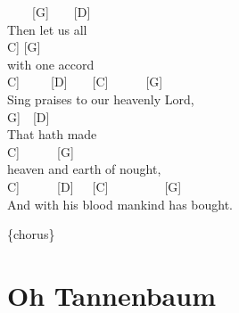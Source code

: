 \documentclass[
  letterpaper,
  a5paper]{memoir}
\begin{document}
~~~~{[}G{]}~~~~{[}D{]}\\
Then let us all\\
\hspace*{0.333em}\hspace*{0.333em}\hspace*{0.333em}\hspace*{0.333em}{[}C{]}
{[}G{]}\\
with one accord~~\\
\hspace*{0.333em}\hspace*{0.333em}\hspace*{0.333em}\hspace*{0.333em}{[}C{]}~~~~~{[}D{]}~~~~{[}C{]}~~~~~~{[}G{]}\\
Sing praises to our heavenly Lord,\\
\hspace*{0.333em}\hspace*{0.333em}\hspace*{0.333em}\hspace*{0.333em}{[}G{]}~~{[}D{]}\\
That hath made\\
\hspace*{0.333em}\hspace*{0.333em}\hspace*{0.333em}\hspace*{0.333em}\hspace*{0.333em}\hspace*{0.333em}\hspace*{0.333em}\hspace*{0.333em}\hspace*{0.333em}\hspace*{0.333em}{[}C{]}~~~~~~{[}G{]}\\
heaven and earth of nought,\\
\hspace*{0.333em}\hspace*{0.333em}\hspace*{0.333em}{[}C{]}~~~~~~{[}D{]}~~~{[}C{]}~~~~~~~~~{[}G{]}\\
And with his blood mankind has bought.

\{chorus\}

\hypertarget{oh-tannenbaum}{%
\chapter{Oh Tannenbaum}\label{oh-tannenbaum}}
\end{document}

